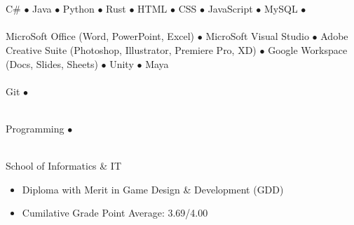 \documentclass[a4paper,10pt]{article}
\begin{document}
\begin{paracol}{2}
\begin{leftcolumn}
      \vspace{0.35cm}

      \Large\noindent{}
      \vspace{0.15cm}\\
      \normalsize{}\\
      \small\lato
      C\# $\bullet$ Java $\bullet$ Python $\bullet$ Rust $\bullet$ HTML $\bullet$ CSS $\bullet$ JavaScript $\bullet$ MySQL $\bullet$
      \vspace{0.35cm}\\
      \normalsize{}\\
      \small\lato
      MicroSoft Office (Word, PowerPoint, Excel) $\bullet$ MicroSoft Visual Studio $\bullet$ Adobe Creative Suite (Photoshop, Illustrator, Premiere Pro, XD) $\bullet$ Google Workspace (Docs, Slides, Sheets) $\bullet$ Unity $\bullet$ Maya
      \vspace{0.35cm}\\
      \normalsize{}\\
      \small\lato
      Git $\bullet$
      \vspace{0.35cm}

      \Large\noindent{}\\
      \vspace{0.15cm}
      \small\lato 
      Programming $\bullet$
    \end{leftcolumn}
    
    \begin{rightcolumn}
      \Large\noindent{}
      \vspace{0.15cm}\\
      \normalsize{} \textbar{} School of Informatics \& IT \hfill\small{}
      \begin{itemize}[left=0pt, labelsep=0.5em, itemsep=0pt, topsep=0pt, parsep=0pt, partopsep=0pt]
        \item \lato Diploma with Merit in Game Design \& Development (GDD)
        \item \lato Cumilative Grade Point Average: 3.69/4.00
      \end{itemize}
            
      \vspace{0.35cm}


\end{rightcolumn}
\end{paracol}
\end{document}
